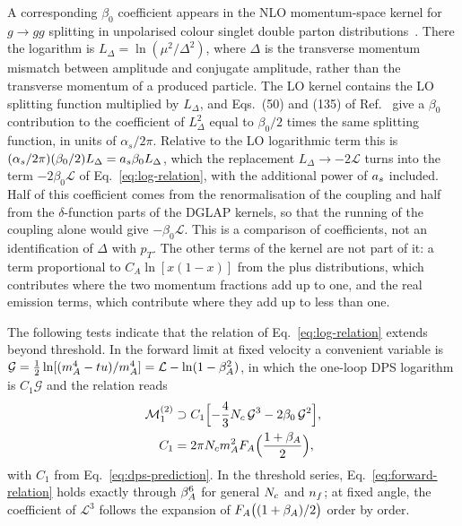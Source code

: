 A corresponding $\beta_0$ coefficient appears in the NLO momentum-space
kernel for $g\to gg$ splitting in unpolarised colour singlet double
parton distributions~\cite{Diehl:2019rdh}.
There the logarithm is $L_\Delta=\ln(\mu^2/\Delta^2)$, where $\Delta$ is
the transverse momentum mismatch between amplitude and conjugate
amplitude, rather than the transverse momentum of a produced particle.
The LO kernel contains the LO splitting function multiplied by
$L_\Delta$, and Eqs.~(50) and (135) of Ref.~\cite{Diehl:2019rdh} give a
$\beta_0$ contribution to the coefficient of $L_\Delta^2$ equal to
$\beta_0/2$ times the same splitting function, in units of
$\alpha_s/2\pi$. Relative to the LO logarithmic term this is
$(\alpha_s/2\pi)(\beta_0/2)L_\Delta=a_s\beta_0L_\Delta$, which the
replacement $L_\Delta\to-2\mathcal L$ turns into the term
$-2\beta_0\mathcal L$ of Eq.~\eqref{eq:log-relation}, with the
additional power of $a_s$ included.
Half of this coefficient comes from the renormalisation of the coupling
and half from the $\delta$-function parts of the DGLAP kernels, so that
the running of the coupling alone would give $-\beta_0\mathcal L$.
This is a comparison of coefficients, not an identification of $\Delta$
with $p_T$. The other terms of the kernel are not part of it: a term
proportional to $C_A\ln[x(1-x)]$ from the plus distributions, which
contributes where the two momentum fractions add up to one, and the
real emission terms, which contribute where they add up to less than one.


The following tests indicate that the relation of Eq.~\eqref{eq:log-relation} extends beyond threshold. In the forward limit at fixed velocity a convenient variable is $\mathcal G=\tfrac12\ln[(m_A^4-tu)/m_A^4]=\mathcal L-\ln(1-\beta_A^2)$, in which the one-loop DPS logarithm is $C_1\mathcal G$ and the relation reads
\begin{align}
 \mathcal M_1^{(2)}&\supset C_1\Bigl[-\frac43N_c\,\mathcal G^3-2\beta_0\,\mathcal G^2\Bigr],
 \label{eq:forward-relation}
 \\
 C_1&=2\pi N_c m_A^2F_A\Bigl(\frac{1+\beta_A}{2}\Bigr),
 \nonumber
\end{align}
with $C_1$ from Eq.~\eqref{eq:dps-prediction}. In the threshold series, Eq.~\eqref{eq:forward-relation} holds exactly through $\beta_A^6$ for general $N_c$ and $n_f$; at fixed angle, the coefficient of $\mathcal L^3$ follows the expansion of $F_A\bigl((1+\beta_A)/2\bigr)$ order by order.

